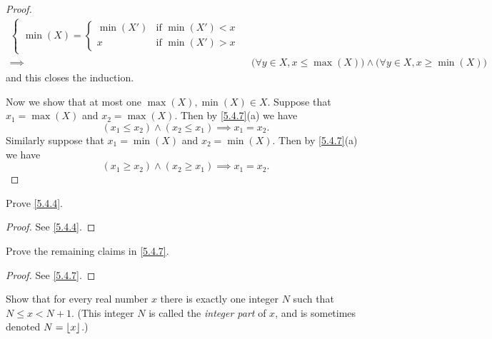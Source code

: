 \begin{proof}
\begin{align*}
\begin{cases}
                 \min(X) = \begin{cases}
                  \min(X') & \text{if } \min(X') < x \\
                  x        & \text{if } \min(X') > x
                \end{cases}
               \end{cases}                                                                                         \\
    \implies & \big(\forall y \in X, x \leq \max(X)\big) \land \big(\forall y \in X, x \geq \min(X)\big)
  \end{align*}
  and this closes the induction.

  Now we show that at most one \(\max(X), \min(X) \in X\).
  Suppose that \(x_1 = \max(X)\) and \(x_2 = \max(X)\).
  Then by \cref{5.4.7}(a) we have
  \[
    (x_1 \leq x_2) \land (x_2 \leq x_1) \implies x_1 = x_2.
  \]
  Similarly suppose that \(x_1 = \min(X)\) and \(x_2 = \min(X)\).
  Then by \cref{5.4.7}(a) we have
  \[
    (x_1 \geq x_2) \land (x_2 \geq x_1) \implies x_1 = x_2.
  \]
\end{proof}

\exercisesection

\begin{ex}\label{ex:5.4.1}
  Prove \cref{5.4.4}.
\end{ex}

\begin{proof}
  See \cref{5.4.4}.
\end{proof}

\begin{ex}\label{ex:5.4.2}
  Prove the remaining claims in \cref{5.4.7}.
\end{ex}

\begin{proof}
  See \cref{5.4.7}.
\end{proof}

\begin{ex}\label{ex:5.4.3}
  Show that for every real number \(x\) there is exactly one integer \(N\) such that \(N \leq x < N + 1\).
  (This integer \(N\) is called the \emph{integer part} of \(x\), and is sometimes denoted \(N = \left\lfloor x\right\rfloor\).)
\end{ex}

